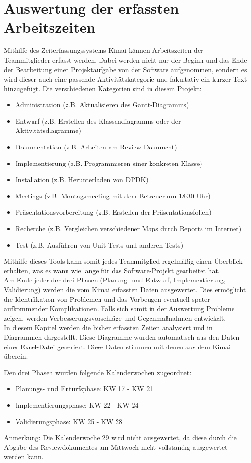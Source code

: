 \documentclass[../review_3.tex]{subfiles}
\begin{document}
\chapter{Auswertung der erfassten Arbeitszeiten}\thispagestyle{fancy}
Mithilfe des  Zeiterfassungssystems Kimai können Arbeitszeiten der Teammitglieder erfasst werden. Dabei werden nicht nur der Beginn und das Ende der Bearbeitung einer Projektaufgabe von der Software aufgenommen, sondern es wird dieser auch eine passende Aktivitätskategorie und fakultativ ein kurzer Text hinzugefügt. Die verschiedenen Kategorien sind in diesem Projekt:
\begin{itemize}
    \setlength{\parskip}{-0.2pt}
    \item Administration (z.B. Aktualisieren des Gantt-Diagramms)
    \item Entwurf (z.B. Erstellen des Klassendiagramms oder der Aktivitätsdiagramme)
    \item Dokumentation (z.B. Arbeiten am Review-Dokument)
    \item Implementierung (z.B. Programmieren einer konkreten Klasse)
    \item Installation (z.B. Herunterladen von DPDK)
    \item Meetings (z.B. Montagsmeeting mit dem Betreuer um 18:30 Uhr)
    \item Präsentationsvorbereitung (z.B. Erstellen der Präsentationsfolien)
    \item Recherche (z.B. Vergleichen verschiedener Maps durch Reports im Internet)
    \item Test (z.B. Ausführen von Unit Tests und anderen Tests)
\end{itemize}
Mithilfe dieses Tools kann somit jedes Teammitglied regelmäßig einen Überblick erhalten, was es wann wie lange für das Software-Projekt gearbeitet hat. \\
Am Ende jeder der drei Phasen (Planung- und Entwurf, Implementierung, Validierung) werden die vom Kimai erfassten Daten ausgewertet. Dies ermöglicht die Identifikation von Problemen und das Vorbeugen eventuell später aufkommender Komplikationen. Falls sich somit in der Auswertung Probleme zeigen, werden Verbesserungsvorschläge und Gegenmaßnahmen entwickelt. \\
In diesem Kapitel werden die bisher erfassten Zeiten analysiert und in Diagrammen dargestellt. Diese Diagramme wurden automatisch aus den Daten einer Excel-Datei generiert. Diese Daten stimmen mit denen aus dem Kimai überein.

Den drei Phasen wurden folgende Kalenderwochen zugeordnet:
\begin{itemize}
    \item Planungs- und Enturfsphase: KW 17 - KW 21
    \item Implementierungsphase: KW 22 - KW 24
    \item Validierungsphase: KW 25 - KW 28
\end{itemize}
Anmerkung: Die Kalenderwoche 29 wird nicht ausgewertet, da diese durch die Abgabe des Reviewdokumentes am Mittwoch nicht vollständig ausgewertet werden kann.
\end{document}
